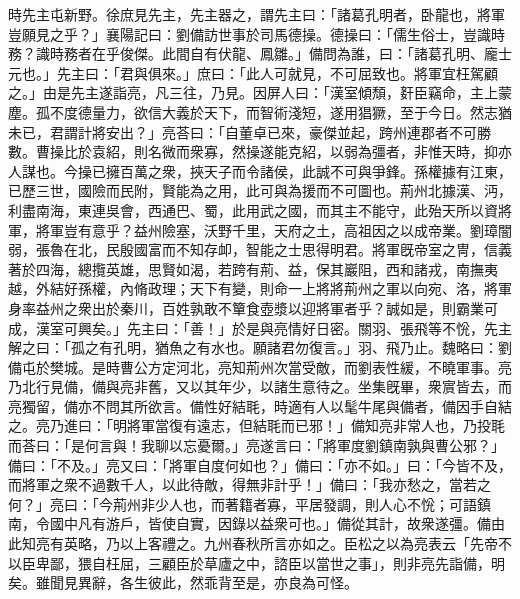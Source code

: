 \begin{pinyinscope}
時先主屯新野。徐庶見先主，先主器之，謂先主曰：「諸葛孔明者，卧龍也，將軍豈願見之乎？」襄陽記曰：劉備訪世事於司馬德操。德操曰：「儒生俗士，豈識時務？識時務者在乎俊傑。此間自有伏龍、鳳雛。」備問為誰，曰：「諸葛孔明、龐士元也。」先主曰：「君與俱來。」庶曰：「此人可就見，不可屈致也。將軍宜枉駕顧之。」由是先主遂詣亮，凡三往，乃見。因屏人曰：「漢室傾頹，姧臣竊命，主上蒙塵。孤不度德量力，欲信大義於天下，而智術淺短，遂用猖獗，至于今日。然志猶未已，君謂計將安出？」亮荅曰：「自董卓已來，豪傑並起，跨州連郡者不可勝數。曹操比於袁紹，則名微而衆寡，然操遂能克紹，以弱為彊者，非惟天時，抑亦人謀也。今操已擁百萬之衆，挾天子而令諸侯，此誠不可與爭鋒。孫權據有江東，已歷三世，國險而民附，賢能為之用，此可與為援而不可圖也。荊州北據漢、沔，利盡南海，東連吳會，西通巴、蜀，此用武之國，而其主不能守，此殆天所以資將軍，將軍豈有意乎？益州險塞，沃野千里，天府之土，高祖因之以成帝業。劉璋闇弱，張魯在北，民殷國富而不知存卹，智能之士思得明君。將軍旣帝室之冑，信義著於四海，總攬英雄，思賢如渴，若跨有荊、益，保其巖阻，西和諸戎，南撫夷越，外結好孫權，內脩政理；天下有變，則命一上將將荊州之軍以向宛、洛，將軍身率益州之衆出於秦川，百姓孰敢不簞食壺漿以迎將軍者乎？誠如是，則霸業可成，漢室可興矣。」先主曰：「善！」於是與亮情好日密。關羽、張飛等不恱，先主解之曰：「孤之有孔明，猶魚之有水也。願諸君勿復言。」羽、飛乃止。魏略曰：劉備屯於樊城。是時曹公方定河北，亮知荊州次當受敵，而劉表性緩，不曉軍事。亮乃北行見備，備與亮非舊，又以其年少，以諸生意待之。坐集旣畢，衆賔皆去，而亮獨留，備亦不問其所欲言。備性好結毦，時適有人以髦牛尾與備者，備因手自結之。亮乃進曰：「明將軍當復有遠志，但結毦而已邪！」備知亮非常人也，乃投毦而荅曰：「是何言與！我聊以忘憂爾。」亮遂言曰：「將軍度劉鎮南孰與曹公邪？」備曰：「不及。」亮又曰：「將軍自度何如也？」備曰：「亦不如。」曰：「今皆不及，而將軍之衆不過數千人，以此待敵，得無非計乎！」備曰：「我亦愁之，當若之何？」亮曰：「今荊州非少人也，而著籍者寡，平居發調，則人心不恱；可語鎮南，令國中凡有游戶，皆使自實，因錄以益衆可也。」備從其計，故衆遂彊。備由此知亮有英略，乃以上客禮之。九州春秋所言亦如之。臣松之以為亮表云「先帝不以臣卑鄙，猥自枉屈，三顧臣於草廬之中，諮臣以當世之事」，則非亮先詣備，明矣。雖聞見異辭，各生彼此，然乖背至是，亦良為可怪。


\end{pinyinscope}
